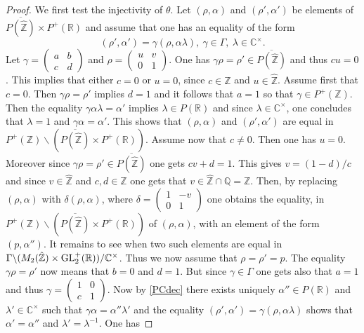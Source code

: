 \documentclass[graybox, envcountsect%
]{svmult}
\def\GL{{\rm GL}}
\def\C{{\mathbb C}}
\def\Q{{\mathbb Q}}
\def\R{{\mathbb R}}
\def\Z{{\mathbb Z}}
\begin{document}
 \begin{proof}  We first test the injectivity of $\theta$. Let $(\rho,\alpha)$ and $(\rho',\alpha')$ be elements of $\overline{P(\hat \Z)}\times P^+(\R)$ and assume that one has an equality of the form 
 $$
 (\rho',\alpha')=\gamma (\rho,\alpha \lambda), \ \gamma \in \Gamma, \ \lambda \in \C^\times.
 $$
 Let $\gamma=\begin{pmatrix} a &b \\
c &d \end{pmatrix}$ and $\rho=\begin{pmatrix} u &v \\
0 &1 \end{pmatrix}$. One has $\gamma \rho=\rho'\in \overline{P(\hat \Z)}$ and thus $cu=0$. This implies that either $c=0$ or $u=0$, since $c\in \Z$ and $u\in \hat \Z$.\newline
 Assume first that $c=0$. Then $\gamma \rho=\rho'$ implies $d=1$ and it follows that $a=1$ so that $\gamma\in P^+(\Z)$. Then the equality $\gamma\alpha \lambda=\alpha'$ implies  $\lambda\in P(\R)$ and since $\lambda \in \C^\times$, one concludes that $\lambda=1$ and $\gamma\alpha =\alpha'$. This shows that $(\rho,\alpha)$ and $(\rho',\alpha')$ are equal in $P^+(\Z)\backslash (\overline{P(\hat \Z)}\times P^+(\R))$. \newline
 Assume now that $c\neq 0$. Then one has $u=0$. 
Moreover since $\gamma \rho=\rho'\in \overline{P(\hat \Z)}$ one gets $cv+d=1$. This gives $v=(1-d)/c$ and since $v\in \hat\Z$ and $c,d\in \Z$ one gets that $v\in \hat\Z\cap \Q=\Z$. Then, by replacing $(\rho,\alpha)$ with $\delta(\rho,\alpha)$, where $\delta=\begin{pmatrix} 1 &-v \\
0 &1 \end{pmatrix}$ one obtains the equality, in $P^+(\Z)\backslash (\overline{P(\hat \Z)}\times P^+(\R))$ of $(\rho,\alpha)$, with an element of the form $(p,\alpha'')$. It remains to see when two such elements are equal in $\Gamma\backslash
(M_2(\hat\Z)\times \GL_2^+(\R)) /\C^\times$. Thus we now assume that $\rho=\rho'=p$. The equality 
$\gamma \rho=\rho'$ now means that $b=0$ and $d=1$. But since $\gamma\in \Gamma$ one gets also that $a=1$ and thus $\gamma= \begin{pmatrix} 1 &0 \\
c &1 \end{pmatrix}$. Now by \eqref{PCdec} there exists uniquely $\alpha''\in P(\R)$ and $\lambda'\in \C^\times$ such that $\gamma\alpha=\alpha''\lambda'$ and the equality $ (\rho',\alpha')=\gamma (\rho,\alpha \lambda)$ shows that $\alpha'=\alpha''$ and $\lambda'=\lambda^{-1}$. One has 

\end{proof}
\end{document}
